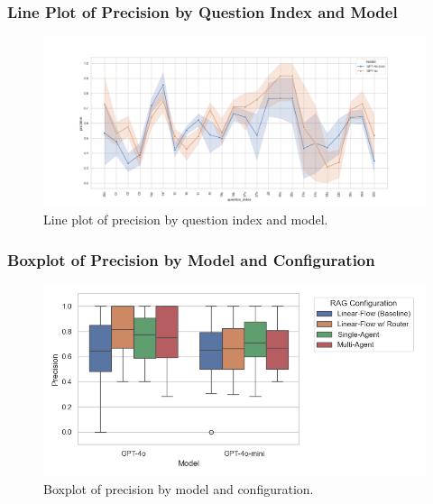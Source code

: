             \subsubsection{Line Plot of Precision by Question Index and Model}
            \begin{figure}[H]
                \centering
                \includegraphics[scale=0.75]{images_exp2/precision/line_precision_by_question_index_and_model.png}
                \caption{Line plot of precision by question index and model.}
                \label{fig:line_precision_by_question_index_and_model}
            \end{figure}

            \subsubsection{Boxplot of Precision by Model and Configuration}
            \begin{figure}[H]
                \centering
                \includegraphics[scale=0.75]{images_exp2/precision/precision_boxplot_by_model_and_configuration.png}
                \caption{Boxplot of precision by model and configuration.}
                \label{fig:precision_boxplot_by_model_and_configuration}
            \end{figure}

